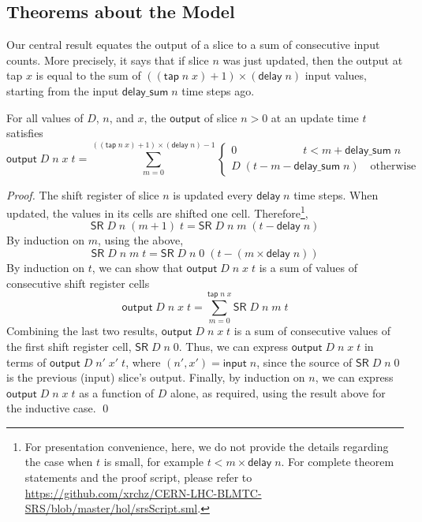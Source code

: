 \documentclass{llncs}
\begin{document}
\subsection{Theorems about the Model}
Our central result equates the output of a slice to a sum of consecutive input counts.
More precisely, it says that if slice $n$ was just updated, then the output at tap $x$ is equal to the sum of $((\mathsf{tap}\;n\;x)+1)\times(\mathsf{delay}\;n)$ input values, starting from the input $\mathsf{delay\_sum}\;n$ time steps ago.

\begin{theorem}\label{output_input_at_update_times}
For all values of $D$, $n$, and $x$, the $\mathsf{output}$ of slice $n>0$ at an update time $t$ satisfies
\begin{equation*}
\mathsf{output}\;D\;n\;x\;t=\sum_{m=0}^{((\mathsf{tap}\;n\;x)+1)\times(\mathsf{delay}\;n)-1}\begin{cases}0 \qquad\qquad\qquad  t<m+\mathsf{delay\_sum}\;n\\D\;(t-m-\mathsf{delay\_sum}\;n)\quad\text{otherwise}\end{cases}
\end{equation*}
\end{theorem}

\begin{proof}
The shift register of slice $n$ is updated every $\mathsf{delay}\;n$ time steps.
When updated, the values in its cells are shifted one cell.
Therefore\footnote{For presentation convenience, here, we do not provide the details regarding the case when $t$ is small, for example $t<m\times\mathsf{delay}\;n$.
For complete theorem statements and the proof script, please refer to \url{https://github.com/xrchz/CERN-LHC-BLMTC-SRS/blob/master/hol/srsScript.sml}.},
\begin{equation*}
\mathsf{SR}\;D\;n\;(m+1)\;t=\mathsf{SR}\;D\;n\;m\;(t-\mathsf{delay}\;n)
\end{equation*}
By induction on $m$, using the above,
\begin{equation*}
\mathsf{SR}\;D\;n\;m\;t=\mathsf{SR}\;D\;n\;0\;(t-(m\times\mathsf{delay}\;n))
\end{equation*}
By induction on $t$, we can show that $\mathsf{output}\;D\;n\;x\;t$ is a sum of values of consecutive shift register cells
\begin{equation*}
\mathsf{output}\;D\;n\;x\;t=\sum_{m=0}^{\mathsf{tap}\;n\;x}\mathsf{SR}\;D\;n\;m\;t
\end{equation*}
Combining the last two results, $\mathsf{output}\;D\;n\;x\;t$ is a sum of consecutive values of the first shift register cell, $\mathsf{SR}\;D\;n\;0$.
Thus, we can express $\mathsf{output}\;D\;n\;x\;t$ in terms of $\mathsf{output}\;D\;n'\;x'\;t$, where $(n',x')=\mathsf{input}\;n$, since the source of $\mathsf{SR}\;D\;n\;0$ is the previous (input) slice's output.
Finally, by induction on $n$, we can express $\mathsf{output}\;D\;n\;x\;t$ as a function of $D$ alone, as required, using the result above for the inductive case.
\qed
\end{proof}
\end{document}
